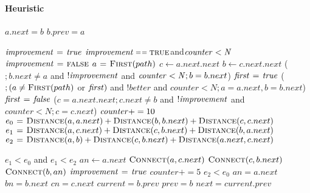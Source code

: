 \paragraph{Heuristic}
\begin{codebox}
\li     $a.next=b$
\li     $b.prev=a$
\end{codebox}
\begin{codebox}
\li $\id{improvement} \gets \id{true}$
\li \While $\id{improvement} \isequal \const{true} $and$ \id{counter}<\id{N}$
\li     \Do
            $\id{improvement} \gets \const{false}$
\li         $a \mathrel{\hspace{1pt}=\hspace{1pt}} \textnormal{\scshape First}(path)$
\li         $c \gets a.next.next$
\li         $b \gets c.next.next$
\li         \For ( $;b.next \neq a $ and $ !\id{improvement} $ and $ \id{counter}<\id{N} ; b=b.next $)
\li             \Do
                    $\id{first} \gets \id{true}$
\li                 \For ($;(a\neq \textnormal{\scshape First}(path) $ or $ \id{first} ) $ and $ !better $ and $ counter <N ;a=a.next, b=b.next$)
\li                     \Do
                            $\id{first} \gets \id{false}$
\li                         \For ($ c=a.next.next; c.next\neq b $ and $ !\id{improvement} $ and $ counter < N; c=c.next$)
\li                             \Do
                                    $\id{counter} += 10$
\li                                 $e_0 \mathrel{\hspace{1pt}=\hspace{1pt}} \textnormal{\scshape Distance}(a, a.next)+
                                               \textnormal{\scshape Distance}(b, b.next)+
                                               \textnormal{\scshape Distance}(c, c.next)$
\li                                 $e_1 \mathrel{\hspace{1pt}=\hspace{1pt}} \textnormal{\scshape Distance}(a, c.next)+
                                               \textnormal{\scshape Distance}(c, b.next)+
                                               \textnormal{\scshape Distance}(b, a.next)$
\li                                 $e_2 \mathrel{\hspace{1pt}=\hspace{1pt}} \textnormal{\scshape Distance}(a, b)+
                                               \textnormal{\scshape Distance}(c, b.next)+
                                               \textnormal{\scshape Distance}(a.next, c.next)$

\li                                 \If $e_1<e_0$ and $e_1<e_2$
\li                                     \Then
                                            $an \gets a.next$
\li                                         $\textnormal{\scshape Connect}(a,c.next)$
\li                                         $\textnormal{\scshape Connect}(c,b.next)$
\li                                         $\textnormal{\scshape Connect}(b,an)$
\li                                         $\id{improvement} \gets \id{true}$
\li                                         $counter+=5$
                                        \End
\li                                 \Else \If $e_2 < e_0$
\li                                     \Then
                                            $an=a.next$  
\li                                         $bn=b.next$  
\li                                         $cn=c.next$
\li                                         $current=b.prev$
\li                                         $prev=b$
\li                                         $next=current.prev$ 


\end{codebox}
